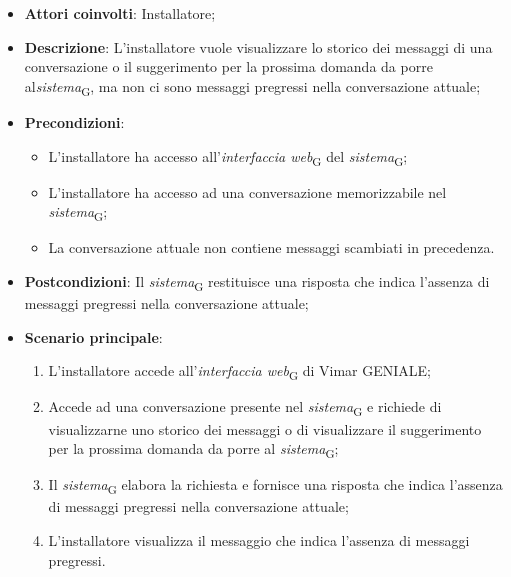 \begin{itemize}
    \item \textbf{Attori coinvolti}: Installatore;
    \item \textbf{Descrizione}: L’installatore vuole visualizzare lo storico dei messaggi di una conversazione o il suggerimento per la prossima domanda da porre al\textit{sistema}\textsubscript{G}, ma non ci sono messaggi pregressi nella conversazione attuale;
    \item \textbf{Precondizioni}: 
    \begin{itemize}
        \item L’installatore ha accesso all’\textit{interfaccia web}\textsubscript{G} del \textit{sistema}\textsubscript{G};
        \item L’installatore ha accesso ad una conversazione memorizzabile nel \textit{sistema}\textsubscript{G};
        \item La conversazione attuale non contiene messaggi scambiati in precedenza.
    \end{itemize}
    \item \textbf{Postcondizioni}: Il \textit{sistema}\textsubscript{G} restituisce una risposta che indica l’assenza di messaggi pregressi nella conversazione attuale;
    \item \textbf{Scenario principale}:
    \begin{enumerate}
        \item L’installatore accede all’\textit{interfaccia web}\textsubscript{G} di Vimar GENIALE;
        \item Accede ad una conversazione presente nel \textit{sistema}\textsubscript{G} e richiede di visualizzarne uno storico dei messaggi o di visualizzare il suggerimento per la prossima domanda da porre al \textit{sistema}\textsubscript{G};
        \item Il \textit{sistema}\textsubscript{G} elabora la richiesta e fornisce una risposta che indica l’assenza di messaggi pregressi nella conversazione attuale;
        \item L’installatore visualizza il messaggio che indica l’assenza di messaggi pregressi.
    \end{enumerate}
\end{itemize}



